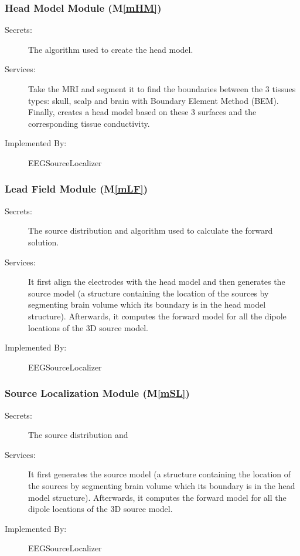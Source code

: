 \documentclass[12pt, titlepage]{article}
\newcommand{\mref}[1]{M\ref{#1}}
\renewcommand{\progname}{EEGSourceLocalizer}
\begin{document}
\subsubsection{Head Model Module (\mref{mHM})}

\begin{description}
\item[Secrets:]The algorithm used to create the head model.
\item[Services:] Take the MRI and segment it to find the boundaries between the 3 tissues types: skull, scalp and brain with Boundary Element Method (BEM). Finally, creates a head model based on these 3 surfaces and the corresponding tissue conductivity.
\item[Implemented By:] \progname{}
\end{description}

\subsubsection{Lead Field Module (\mref{mLF})}

\begin{description}
\item[Secrets:]The source distribution and algorithm used to calculate the forward solution.
\item[Services:] It first align the electrodes with the head model and then generates the source model (a structure containing the location of the sources by segmenting brain volume which its boundary is in the head model structure). Afterwards, it computes the forward model for all the dipole locations of the 3D source model.
\item[Implemented By:] \progname{}
\end{description}

\subsubsection{Source Localization Module (\mref{mSL})}

\begin{description}
\item[Secrets:]The source distribution and 
\item[Services:] It first generates the source model (a structure containing the location of the sources by segmenting brain volume which its boundary is in the head model structure). Afterwards, it computes the forward model for all the dipole locations of the 3D source model.
\item[Implemented By:] \progname{}
\end{description}
\end{document}
